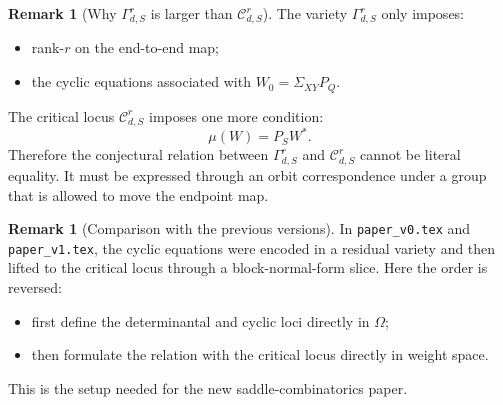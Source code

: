 \documentclass{article}
\theoremstyle{definition}
\newtheorem{remark}[theorem]{Remark}
\begin{document}
\begin{remark}[Why $\Gamma_{d,S}^r$ is larger than $\mathcal C_{d,S}^r$]
The variety $\Gamma_{d,S}^r$ only imposes:
\begin{itemize}
\item rank-$r$ on the end-to-end map;
\item the cyclic equations associated with $W_0=\Sigma_{XY}P_Q$.
\end{itemize}
The critical locus $\mathcal C_{d,S}^r$ imposes one more condition:
\[
\mu(W)=P_SW^\ast.
\]
Therefore the conjectural relation between $\Gamma_{d,S}^r$ and $\mathcal C_{d,S}^r$ cannot be literal equality. It must be expressed through an orbit correspondence under a group that is allowed to move the endpoint map.
\end{remark}

\begin{remark}[Comparison with the previous versions]
In \texttt{paper\_v0.tex} and \texttt{paper\_v1.tex}, the cyclic equations were encoded in a residual variety and then lifted to the critical locus through a block-normal-form slice. Here the order is reversed:
\begin{itemize}
\item first define the determinantal and cyclic loci directly in $\Omega$;
\item then formulate the relation with the critical locus directly in weight space.
\end{itemize}
This is the setup needed for the new saddle-combinatorics paper.
\end{remark}
\end{document}
